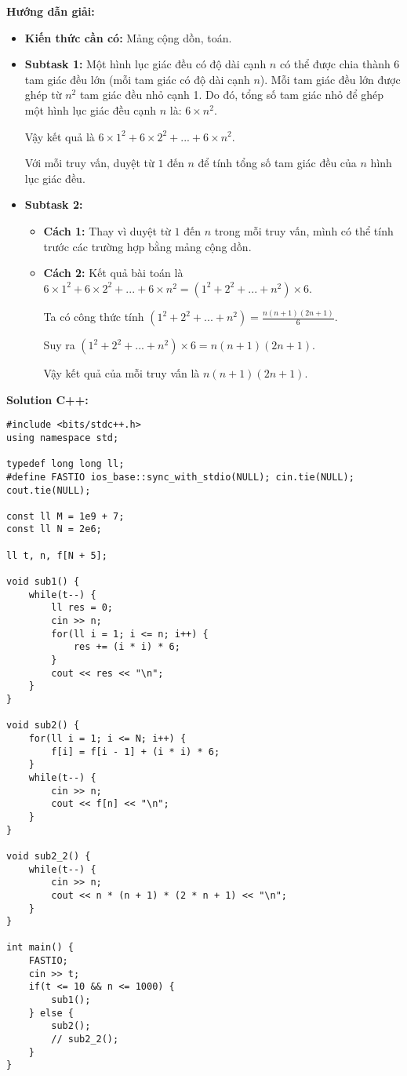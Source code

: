 \documentclass[12pt]{scrartcl}  %
\begin{document}
\textbf{Hướng dẫn giải:}
\begin{itemize}
    \item \textbf{Kiến thức cần có:} Mảng cộng dồn, toán.
    \item \textbf{Subtask 1:} Một hình lục giác đều có độ dài cạnh $n$ có thể được chia thành 6
    tam giác đều lớn (mỗi tam giác có độ dài cạnh $n$). Mỗi tam giác đều lớn được
    ghép từ $n^2$ tam giác đều nhỏ cạnh 1. Do đó, tổng số tam giác nhỏ để ghép một hình lục giác đều
    cạnh $n$ là: $6 \times n^2$.
    
    Vậy kết quả là $6 \times 1^2 + 6 \times 2^2 + ... + 6 \times n^2$.

    Với mỗi truy vấn, duyệt từ $1$ đến $n$ để tính tổng số tam giác đều của $n$ hình lục
    giác đều.
    \item \textbf{Subtask 2:} 
    \begin{itemize}
        \item \textbf{Cách 1:} Thay vì duyệt từ $1$ đến $n$ trong mỗi truy vấn, mình có thể
        tính trước các trường hợp bằng mảng cộng dồn.
        \item \textbf{Cách 2:} Kết quả bài toán là $6 \times 1^2 + 6 \times 2^2 + ... + 6 \times n^2
        = (1^2 + 2^2 + ... + n^2) \times 6$.
        
        Ta có công thức tính $(1^2 + 2^2 + ... + n^2) = \frac{n(n + 1)(2n + 1)}{6}$.

        Suy ra $(1^2 + 2^2 + ... + n^2) \times 6 = n(n + 1)(2n + 1)$.
        
        Vậy kết quả của mỗi truy vấn là $n(n + 1)(2n + 1)$.
    \end{itemize}
\end{itemize}

\textbf{Solution C++:}
\begin{lstlisting}
#include <bits/stdc++.h>
using namespace std;

typedef long long ll;
#define FASTIO ios_base::sync_with_stdio(NULL); cin.tie(NULL); cout.tie(NULL);

const ll M = 1e9 + 7;
const ll N = 2e6;

ll t, n, f[N + 5];

void sub1() {
    while(t--) {
        ll res = 0;
        cin >> n;
        for(ll i = 1; i <= n; i++) {
            res += (i * i) * 6;
        }
        cout << res << "\n";
    }
}

void sub2() {
    for(ll i = 1; i <= N; i++) {
        f[i] = f[i - 1] + (i * i) * 6;
    }
    while(t--) {
        cin >> n;
        cout << f[n] << "\n";
    }
}

void sub2_2() {
    while(t--) {
        cin >> n;
        cout << n * (n + 1) * (2 * n + 1) << "\n";
    }
}

int main() {
    FASTIO;
    cin >> t;
    if(t <= 10 && n <= 1000) {
        sub1();
    } else {
        sub2();
        // sub2_2();
    }
}

\end{lstlisting}
\end{document}
